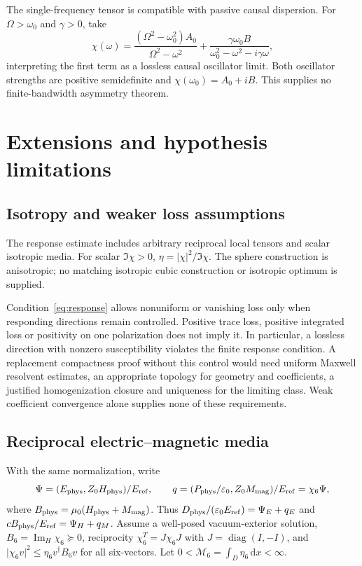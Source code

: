 \documentclass[11pt]{article}
\newcommand{\ImH}{\operatorname{Im}_{\!H}}
\newcommand{\dd}{\,\mathrm{d}}
\newcommand{\abs}[1]{\lvert #1\rvert}
\begin{document}
The single-frequency tensor is compatible with passive causal dispersion. For $\Omega>\omega_0$ and $\gamma>0$, take
\begin{equation}\label{eq:causal}
 \chi(\omega)=\frac{(\Omega^2-\omega_0^2)A_0}{\Omega^2-\omega^2}
       +\frac{\gamma\omega_0 B}{\omega_0^2-\omega^2-i\gamma\omega},
\end{equation}
interpreting the first term as a lossless causal oscillator limit. Both oscillator strengths are positive semidefinite and $\chi(\omega_0)=A_0+iB$. This supplies no finite-bandwidth asymmetry theorem.

\section{Extensions and hypothesis limitations}\label{sec:extensions}
\subsection{Isotropy and weaker loss assumptions}
The response estimate includes arbitrary reciprocal local tensors and scalar isotropic media. For scalar $\Im\chi>0$, $\eta=\abs\chi^2/\Im\chi$. The sphere construction is anisotropic; no matching isotropic cubic construction or isotropic optimum is supplied.

Condition~\eqref{eq:response} allows nonuniform or vanishing loss only when responding directions remain controlled. Positive trace loss, positive integrated loss or positivity on one polarization does not imply it. In particular, a lossless direction with nonzero susceptibility violates the finite response condition. A replacement compactness proof without this control would need uniform Maxwell resolvent estimates, an appropriate topology for geometry and coefficients, a justified homogenization closure and uniqueness for the limiting class. Weak coefficient convergence alone supplies none of these requirements.

\subsection{Reciprocal electric--magnetic media}
With the same normalization, write
\[
 \Psi=(E_{\rm phys},Z_0H_{\rm phys})/E_{\rm ref},\qquad
 q=(P_{\rm phys}/\varepsilon_0,Z_0M_{\rm mag})/E_{\rm ref}=\chi_6\Psi,
\]
where $B_{\rm phys}=\mu_0(H_{\rm phys}+M_{\rm mag})$. Thus $D_{\rm phys}/(\varepsilon_0E_{\rm ref})=\Psi_E+q_E$ and $cB_{\rm phys}/E_{\rm ref}=\Psi_H+q_M$. Assume a well-posed vacuum-exterior solution, $B_6=\ImH\chi_6\succeq0$, reciprocity $\chi_6^T=J\chi_6J$ with $J=\operatorname{diag}(I,-I)$, and $\abs{\chi_6v}^2\leq\eta_6v^\dagger B_6v$ for all six-vectors. Let $0<\mathcal M_6=\int_D\eta_6\dd x<\infty$.
\end{document}
